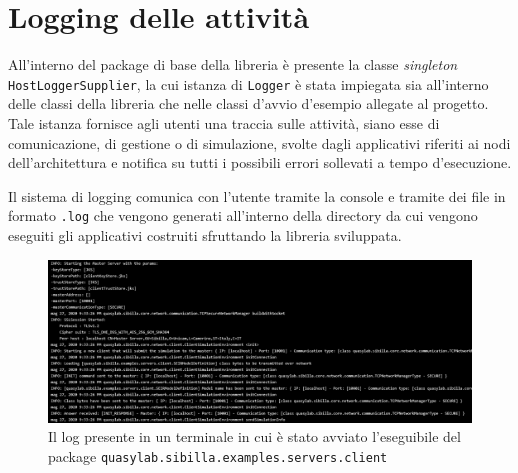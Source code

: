 \section{Logging delle attività}
All'interno del package di base della libreria è presente la classe \emph{singleton} \texttt{HostLoggerSupplier}, la cui istanza di \texttt{Logger} è stata impiegata sia all'interno delle classi della libreria che nelle classi d'avvio d'esempio allegate al progetto.
Tale istanza fornisce agli utenti una traccia sulle attività, siano esse di comunicazione, di gestione o di simulazione, svolte dagli applicativi riferiti ai nodi dell'architettura e notifica su tutti i possibili errori sollevati a tempo d'esecuzione.

Il sistema di logging comunica con l'utente tramite la console e tramite dei file in formato \texttt{.log} che vengono generati all'interno della directory da cui vengono eseguiti gli applicativi costruiti sfruttando la libreria sviluppata.

\begin{figure}[H]
    \includegraphics[width=\linewidth]{images/clientexamplelog.png}
    \captionsetup{justification=centering}
    \caption{Il log presente in un terminale in cui è stato avviato l'eseguibile del package \texttt{quasylab.sibilla.examples.servers.client}}
  \end{figure}